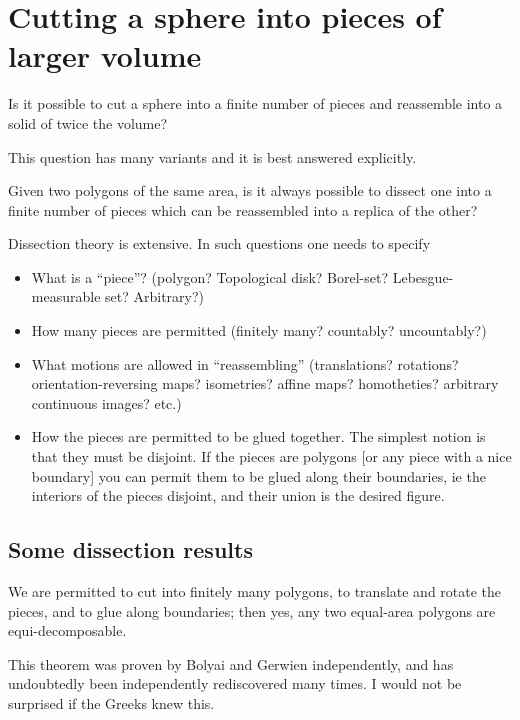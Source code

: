 \section{Cutting a sphere into pieces of larger volume}


Is it possible to cut a sphere into a finite number of pieces and
reassemble into a solid of twice the volume?

This question has many variants and it is best answered explicitly.

Given two polygons of the same area, is it always possible to dissect
one into a finite number of pieces which can be reassembled into a
replica of the other?

Dissection theory is extensive.  In such questions one needs to specify

\begin{itemize}
  \item What is a ``piece''?  (polygon?  Topological disk?  Borel-set?
  Lebesgue-measurable set?  Arbitrary?)

  \item How many pieces are permitted (finitely many? countably?
  uncountably?)

  \item What motions are allowed in ``reassembling'' (translations?
  rotations?  orientation-reversing maps?  isometries?  affine maps?
  homotheties?  arbitrary continuous images?  etc.)

  \item How the pieces are permitted to be glued together.  The simplest
  notion is that they must be disjoint.  If the pieces are polygons [or
  any piece with a nice boundary] you can permit them to be glued along
  their boundaries, ie the interiors of the pieces disjoint, and their
  union is the desired figure.
\end{itemize}

\subsection{Some dissection results}

We are permitted to cut into finitely many polygons, to translate and
rotate the pieces, and to glue along boundaries; then yes, any two
equal-area polygons are equi-decomposable.

This theorem was proven by Bolyai and Gerwien independently, and has
undoubtedly been independently rediscovered many times.  I would not be
surprised if the Greeks knew this.

